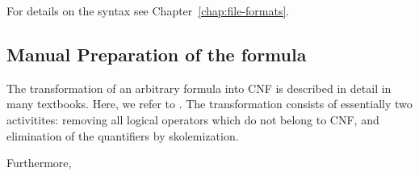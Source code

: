 For details on the syntax see Chapter~\ref{chap:file-formats}.


\subsection{Manual Preparation of the formula}
The transformation of an arbitrary formula into CNF is described in detail
in many textbooks. Here, we refer to \cite{Lov78,Chang75}.
The transformation consists of essentially two activitites: 
removing all logical operators which do not belong to CNF, and
elimination of the quantifiers by skolemization.

Furthermore,

